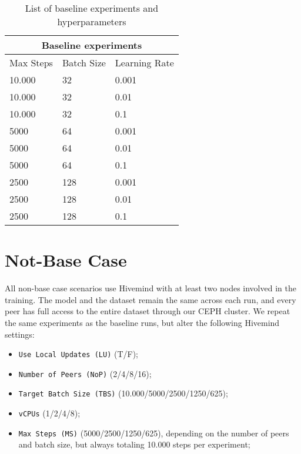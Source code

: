 \begin{table}[ht]
    \centering
    \caption{List of baseline experiments and hyperparameters}
    \begin{tabular}{ |p{3cm}|p{3cm}|p{3cm}|  }
        \hline
        \multicolumn{3}{|c|}{Baseline experiments} \\
        \hline
        Max Steps & Batch Size & Learning Rate     \\
        \hline
        10.000    & 32         & 0.001             \\
        10.000    & 32         & 0.01              \\
        10.000    & 32         & 0.1               \\
        5000      & 64         & 0.001             \\
        5000      & 64         & 0.01              \\
        5000      & 64         & 0.1               \\
        2500      & 128        & 0.001             \\
        2500      & 128        & 0.01              \\
        2500      & 128        & 0.1               \\
        \hline
    \end{tabular}
    \label{table:baseline-experiments}
\end{table}

\clearpage

\section{Not-Base Case}

All non-base case scenarios use Hivemind with at least two nodes involved in the training.
The model and the dataset remain the same across each run, and every peer has full access to the entire dataset through our CEPH cluster.
We repeat the same experiments as the baseline runs, but alter the following Hivemind settings:
\begin{itemize}
    \item \texttt{Use Local Updates (LU)} (T/F);
    \item \texttt{Number of Peers (NoP)} (2/4/8/16);
    \item \texttt{Target Batch Size (TBS)} (10.000/5000/2500/1250/625);
    \item \texttt{vCPUs} (1/2/4/8);
    \item \texttt{Max Steps (MS)} (5000/2500/1250/625), depending on the number of peers and batch size, but always totaling 10.000 steps per experiment;
\end{itemize}


